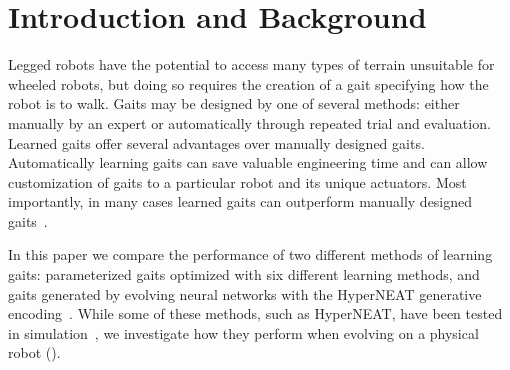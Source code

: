 \section{Introduction and Background}





Legged robots have the potential to access many types of terrain
unsuitable for wheeled robots, but doing so requires the creation of a
gait specifying how the robot is to walk.  Gaits may be designed
by one of several methods: either manually by an expert or
automatically through repeated trial and evaluation.  Learned gaits
offer several advantages over manually designed gaits.  Automatically
learning gaits can save valuable engineering time and can allow
customization of gaits to a particular robot and its unique actuators.
Most importantly, in many cases learned gaits can outperform manually
designed gaits~\cite{hornby2005autonomous, valsalam2008modular}.

In this paper we compare the performance of two different methods of
learning gaits: parameterized gaits optimized with six different
learning methods, and gaits generated by evolving neural networks with
the HyperNEAT generative encoding~\cite{stanley2009hypercube}. While
some of these methods, such as HyperNEAT, have been tested in
simulation~\cite{clune2009evolving, clune2011performance}, we
investigate how they perform when evolving on a physical robot
().

